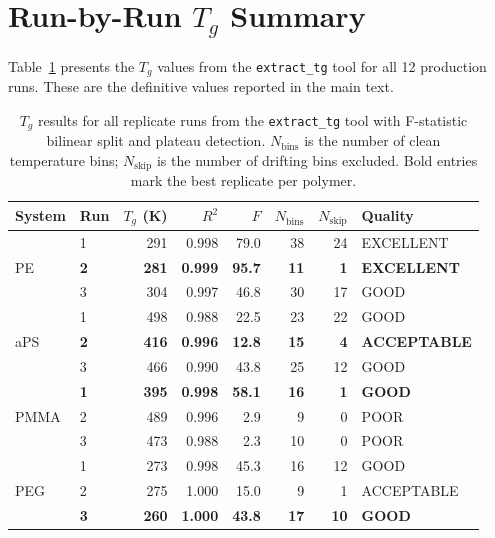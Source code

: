 \documentclass[journal=acsami,manuscript=suppinfo]{achemso}
\begin{document}
\section{Run-by-Run $T_g$ Summary}
\label{sec:si_tg_summary}

Table~\ref{tab:si_tg} presents the $T_g$ values from the \texttt{extract\_tg} tool for all 12 production runs.
These are the definitive values reported in the main text.

\begin{table}[H]
\centering
\caption{$T_g$ results for all replicate runs from the \texttt{extract\_tg} tool with F-statistic bilinear split and plateau detection.
$N_{\text{bins}}$ is the number of clean temperature bins; $N_{\text{skip}}$ is the number of drifting bins excluded.
Bold entries mark the best replicate per polymer.}
\label{tab:si_tg}
\small
\begin{tabular}{llrrrrrl}
\toprule
\textbf{System} & \textbf{Run} & $T_g$ (K) & $R^2$ & $F$ & $N_{\text{bins}}$ & $N_{\text{skip}}$ & \textbf{Quality} \\
\midrule
\multirow{3}{*}{PE}
  & 1         & 291 & 0.998 & 79.0 & 38 & 24 & EXCELLENT \\
  & \textbf{2} & \textbf{281} & \textbf{0.999} & \textbf{95.7} & \textbf{11} & \textbf{1} & \textbf{EXCELLENT} \\
  & 3         & 304 & 0.997 & 46.8 & 30 & 17 & GOOD \\
\midrule
\multirow{3}{*}{aPS}
  & 1         & 498 & 0.988 & 22.5 & 23 & 22 & GOOD \\
  & \textbf{2} & \textbf{416} & \textbf{0.996} & \textbf{12.8} & \textbf{15} & \textbf{4} & \textbf{ACCEPTABLE} \\
  & 3         & 466 & 0.990 & 43.8 & 25 & 12 & GOOD \\
\midrule
\multirow{3}{*}{PMMA}
  & \textbf{1} & \textbf{395} & \textbf{0.998} & \textbf{58.1} & \textbf{16} & \textbf{1} & \textbf{GOOD} \\
  & 2         & 489 & 0.996 & 2.9  & 9  & 0 & POOR \\
  & 3         & 473 & 0.988 & 2.3  & 10 & 0 & POOR \\
\midrule
\multirow{3}{*}{PEG}
  & 1         & 273 & 0.998 & 45.3 & 16 & 12 & GOOD \\
  & 2         & 275 & 1.000 & 15.0 & 9  & 1 & ACCEPTABLE \\
  & \textbf{3} & \textbf{260} & \textbf{1.000} & \textbf{43.8} & \textbf{17} & \textbf{10} & \textbf{GOOD} \\
\bottomrule
\end{tabular}
\end{table}
\end{document}
